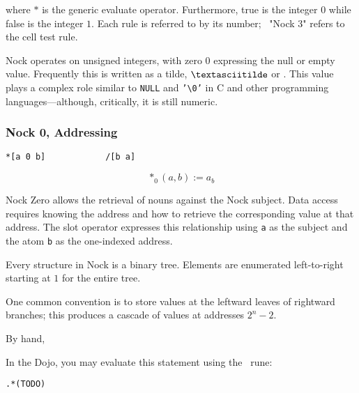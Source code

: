 where $*$ is the generic evaluate operator.  Furthermore, \textrm{true} is the integer $0$ while \textrm{false} is the integer $1$.
Each rule is referred to by its number; \eg~"Nock 3" refers to the cell test rule.

Nock operates on unsigned integers, with zero $0$ expressing the null or empty value.  Frequently this is written as a tilde, $\textasciitilde$ or \nullchr.  This value plays a complex role similar to \texttt{NULL} and \texttt{'\textbackslash 0'} in C and other programming languages—although, critically, it is still numeric.

\subsubsection[Nock 0]{Nock 0, Addressing}

\begin{lstlisting}[style=nonumbers]
*[a 0 b]            /[b a]
\end{lstlisting}

$$
*_{0}(a,b) := a_{b}
$$

Nock Zero allows the retrieval of nouns against the Nock subject.  Data access requires knowing the address and how to retrieve the corresponding value at that address.  The slot operator expresses this relationship using \texttt{a} as the subject and the atom \texttt{b} as the one-indexed address.

Every structure in Nock is a binary tree.  Elements are enumerated left-to-right starting at $1$ for the entire tree.


One common convention is to store values at the leftward leaves of rightward branches; this produces a cascade of values at addresses $2^{n}-2$.





By hand,



In the Dojo, you may evaluate this statement using the \pdottar~rune:

\begin{lstlisting}[style=nonumbers]
.*(TODO)
\end{lstlisting}

